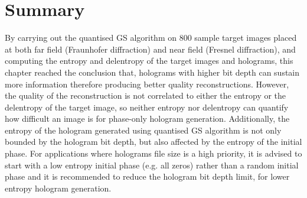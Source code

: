 \section{Summary}
	By carrying out the quantised GS algorithm on 800 sample target images placed at both far field (Fraunhofer diffraction) and near field (Fresnel diffraction), and computing the entropy and delentropy of the target images and holograms, this chapter reached the conclusion that, holograms with higher bit depth can sustain more information therefore producing better quality reconstructions. However, the quality of the reconstruction is not correlated to either the entropy or the delentropy of the target image, so neither entropy nor delentropy can quantify how difficult an image is for phase-only hologram generation. Additionally, the entropy of the hologram generated using quantised GS algorithm is not only bounded by the hologram bit depth, but also affected by the entropy of the initial phase. For applications where holograms file size is a high priority, it is advised to start with a low entropy initial phase (e.g. all zeros) rather than a random initial phase and it is recommended to reduce the hologram bit depth limit, for lower entropy hologram generation.
